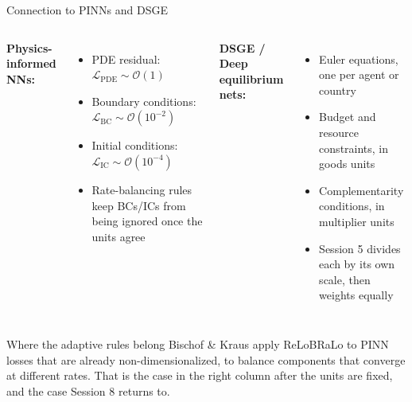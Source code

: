 \documentclass[aspectratio=169,11pt]{beamer}
\newcommand{\emphc}[1]{\textcolor{harvardcrimson}{#1}}
\begin{document}
\begin{frame}{Connection to PINNs and DSGE}
\small
\begin{columns}[T]
\textbf{Physics-informed NNs:}
\begin{itemize}
    \item PDE residual: $\mathcal{L}_\text{PDE} \sim \mathcal{O}(1)$
    \item Boundary conditions: $\mathcal{L}_\text{BC} \sim \mathcal{O}(10^{-2})$
    \item Initial conditions: $\mathcal{L}_\text{IC} \sim \mathcal{O}(10^{-4})$
    \item Rate-balancing rules keep BCs/ICs from being \emphc{ignored} once the units agree
\end{itemize}

\textbf{DSGE / Deep equilibrium nets:}
\begin{itemize}
    \item Euler equations, one per agent or country
    \item Budget and resource constraints, in goods units
    \item Complementarity conditions, in multiplier units
    \item Session 5 divides each by its own scale, then weights equally
\end{itemize}
\end{columns}

\vspace{0.1cm}
\begin{block}{Where the adaptive rules belong}
Bischof \& Kraus apply ReLoBRaLo to PINN losses that are already non-dimensionalized, to balance components that converge at different rates. That is the case in the right column after the units are fixed, and the case Session 8 returns to.
\end{block}
\end{frame}
\end{document}

